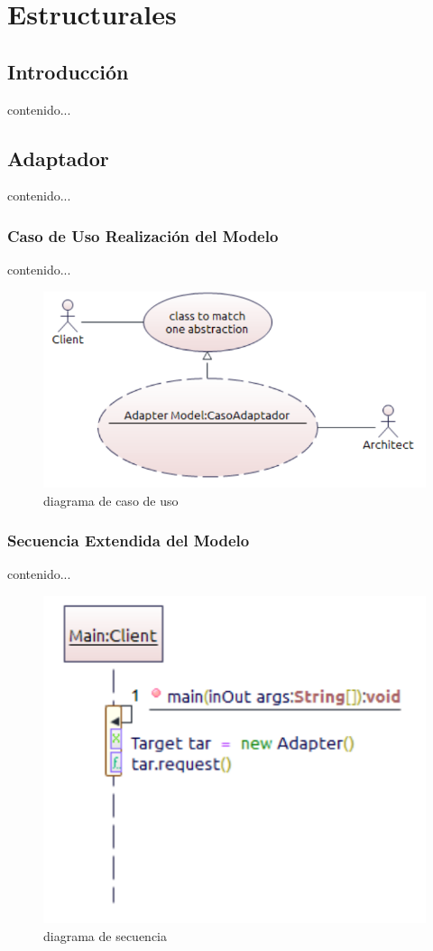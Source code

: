 \chapter{Estructurales}
\section{Introducción}
contenido...
\newpage
\section{Adaptador}
contenido...
\subsection{Caso de Uso Realización del Modelo}
contenido...
\begin{figure}[th!]
	\centering
	\includegraphics[width=0.7\linewidth]{arquitectura_diseno/imgs/MCU_Adaptador}
	\caption{diagrama de caso de uso}
\end{figure}
\newpage
\subsection{Secuencia Extendida del Modelo}
contenido...
\begin{figure}[th!]
	\centering
	\includegraphics[width=0.7\linewidth]{arquitectura_diseno/imgs/MSE_Adaptador}
	\caption{diagrama de secuencia}
\end{figure}
\newpage

